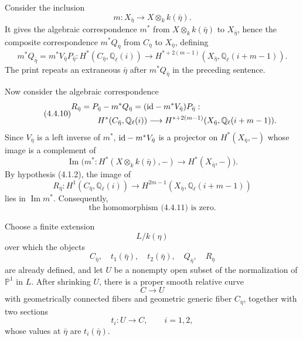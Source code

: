 Consider the inclusion
\begin{equation*}
m:X_{\bar\eta}\longrightarrow X\otimes_k k(\bar\eta).
\end{equation*}
It gives the algebraic correspondence $m^*$ from
$X\otimes_k k(\bar\eta)$ to $X_{\bar\eta}$, hence the composite
correspondence $m^*Q_{\bar\eta}$ from $C_{\bar\eta}$ to
$X_{\bar\eta}$, defining
\begin{equation}\tag{4.4.9}
m^*Q_{\bar\eta}=m^*V_{\bar\eta}P_{\bar\eta}:
H^*(C_{\bar\eta},\mathbb Q_\ell(i))
\longrightarrow
H^{*+2(m-1)}(X_{\bar\eta},\mathbb Q_\ell(i+m-1)).
\end{equation}
The print repeats an extraneous $\bar\eta$ after $m^*Q_{\bar\eta}$ in
the preceding sentence.

Now consider the algebraic correspondence
\begin{equation}\tag{4.4.10}
\begin{split}
R_{\bar\eta}
&=P_{\bar\eta}-m^*Q_{\bar\eta}
=(\mathrm{id}-m^*V_{\bar\eta})P_{\bar\eta}:\\
&\hspace{2em}H^*(C_{\bar\eta},\mathbb Q_\ell(i))
\longrightarrow
H^{*+2(m-1)}(X_{\bar\eta},\mathbb Q_\ell(i+m-1)).
\end{split}
\end{equation}
Since $V_{\bar\eta}$ is a left inverse of $m^*$,
$\mathrm{id}-m^*V_{\bar\eta}$ is a projector on $H^*(X_{\bar\eta},-)$ whose
image is a complement of
\begin{equation*}
\operatorname{Im}\bigl(m^*:H^*(X\otimes_k k(\bar\eta),-)
\longrightarrow H^*(X_{\bar\eta},-)\bigr).
\end{equation*}
By hypothesis (4.1.2), the image of
\begin{equation}\tag{4.4.11}
R_{\bar\eta}:H^1(C_{\bar\eta},\mathbb Q_\ell(i))
\longrightarrow
H^{2m-1}(X_{\bar\eta},\mathbb Q_\ell(i+m-1))
\end{equation}
lies in $\operatorname{Im}m^*$.  Consequently,
\begin{equation}\tag{4.4.12}
\text{the homomorphism (4.4.11) is zero.}
\end{equation}

Choose a finite extension
\begin{equation*}
L/k(\eta)
\end{equation*}
over which the objects
\begin{equation*}
C_{\bar\eta},\quad t_1(\bar\eta),\quad t_2(\bar\eta),\quad
Q_{\bar\eta},\quad R_{\bar\eta}
\end{equation*}
are already defined, and let $U$ be a nonempty open subset of the
normalization of $\mathbb P^1$ in $L$.  After shrinking $U$, there is a
proper smooth relative curve
\begin{equation*}
C\longrightarrow U
\end{equation*}
with geometrically connected fibers and geometric generic fiber
$C_{\bar\eta}$, together with two sections
\begin{equation*}
t_i:U\longrightarrow C,\qquad i=1,2,
\end{equation*}
whose values at $\bar\eta$ are $t_i(\bar\eta)$.

